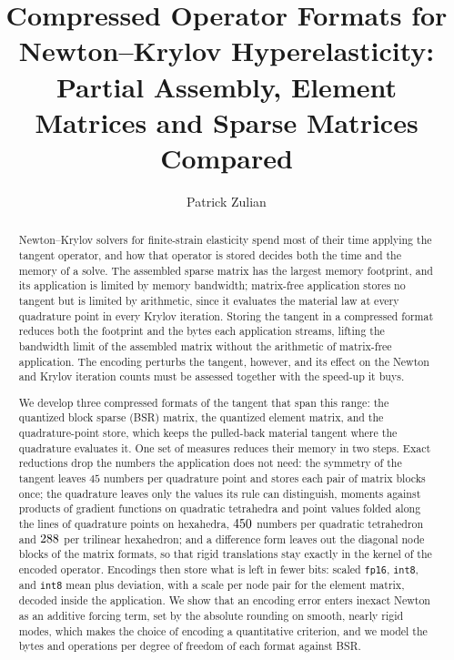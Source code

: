 \documentclass[sigconf,balance=false]{acmart}
\begin{document}
\title{Compressed Operator Formats for Newton--Krylov Hyperelasticity: Partial Assembly, Element
Matrices and Sparse Matrices Compared}

\author{Patrick Zulian}

\begin{abstract}
Newton--Krylov solvers for finite-strain elasticity spend most of their time applying the tangent
operator, and how that operator is stored decides both the time and the memory of a solve.  The
assembled sparse matrix has the largest memory footprint, and its application is limited by memory
bandwidth; matrix-free application stores no tangent but is limited by arithmetic, since it
evaluates the material law at every quadrature point in every Krylov iteration.  Storing the tangent
in a compressed format reduces both the footprint and the bytes each application streams, lifting
the bandwidth limit of the assembled matrix without the arithmetic of matrix-free application.  The
encoding perturbs the tangent, however, and its effect on the Newton and Krylov iteration counts
must be assessed together with the speed-up it buys.

We develop three compressed formats of the tangent that span this range: the quantized block
sparse (BSR) matrix, the quantized element matrix, and the quadrature-point store, which keeps the
pulled-back material tangent where the quadrature evaluates it.  One set of measures reduces their
memory in two steps.  Exact reductions drop the numbers the application does not need: the symmetry
of the tangent leaves $45$ numbers per quadrature point and stores each pair of matrix blocks once;
the quadrature leaves only the values its rule can distinguish, moments against products of
gradient functions on quadratic tetrahedra and point values folded along the lines of quadrature
points on hexahedra, $450$ numbers per quadratic tetrahedron and $288$ per
trilinear hexahedron; and a difference form leaves out the diagonal node blocks of the matrix
formats, so that rigid translations stay exactly in the kernel of the encoded operator.  Encodings
then store what is left in fewer bits: scaled \texttt{fp16}, \texttt{int8}, and \texttt{int8} mean
plus deviation, with a scale per node pair for the element matrix, decoded inside the application.
We show that an
encoding error enters inexact Newton as an additive forcing term, set by the absolute rounding on
smooth, nearly rigid modes, which makes the choice of encoding a quantitative criterion, and we
model the bytes and operations per degree of freedom of each format against BSR.


\end{abstract}
\end{document}
